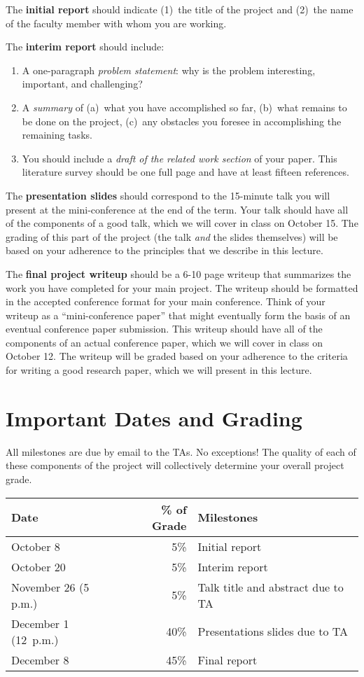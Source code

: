 \documentclass[11pt]{article}
\begin{document}
The {\bf initial report} should indicate (1)~the title of the project and
(2)~the name of the faculty member with whom you are working.

The {\bf interim report} should include:
\begin{enumerate}
\item A one-paragraph {\em problem statement}: why is the problem
  interesting, important, and challenging?
\item A {\em summary} of (a)~what you have accomplished so far, (b)~what
  remains to be done on the project, (c)~any obstacles you foresee in
  accomplishing the remaining tasks.
\item You should include a {\em draft of the related work section} of
  your paper.  This literature survey should be one full page and have
  at least fifteen references.
\end{enumerate}

The {\bf presentation slides} should correspond to the 15-minute talk
you will present at the mini-conference at the end of the term.  Your
talk should have all of the components of a good talk, which we will
cover in class on October 15.  The grading of this part of the project
(the talk {\em and} the slides themselves) will be based on your
adherence to the principles that we describe in this lecture.

The {\bf final project writeup} should be a 6-10 page writeup that
summarizes the work you have completed for your main project.  The
writeup should be formatted in the accepted conference format for your
main conference.  Think of your writeup as a ``mini-conference paper''
that might eventually form the basis of an eventual conference paper
submission.  This writeup should have all of the components of an actual
conference paper, which we will cover in class on October 12.  The
writeup will be graded based on your adherence to the criteria for
writing a good research paper, which we will present in this lecture.

\section{Important Dates and Grading}

All milestones are due by email to the TAs.  No exceptions!  The quality
of each of these components of the project will collectively determine
your overall project grade.

\begin{center}
\begin{tabular}{lrp{3.5in}}
{\bf Date} & {\bf \% of Grade} & {\bf Milestones} \\ \hline
October 8 & 5\% & Initial report \\
October 20 & 5\% & Interim report \\
November 26 (5 p.m.) & 5\% & Talk title and abstract due to TA \\
December 1 (12~p.m.)& 40\% & Presentations slides due to TA \\
December 8 & 45\% & Final report 
\end{tabular}
\end{center}
\end{document}
